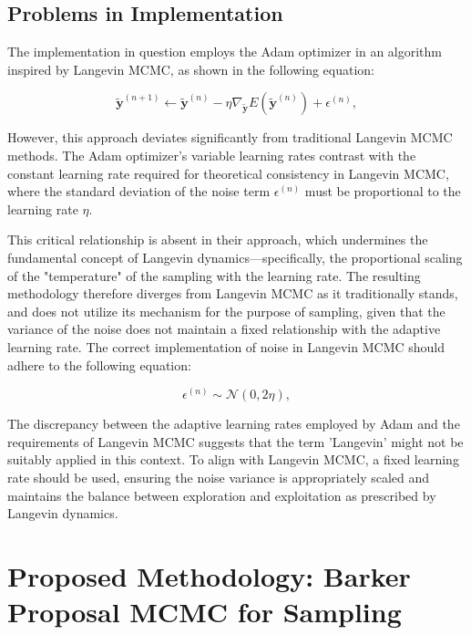 \documentclass{article}
\begin{document}
\subsection{Problems in Implementation}
The implementation in question employs the Adam optimizer in an algorithm inspired by Langevin MCMC, as shown in the following equation:

\begin{equation}
    \tilde{\boldsymbol{y}}^{(n+1)} \leftarrow \tilde{\boldsymbol{y}}^{(n)} - \eta \nabla_{\tilde{\boldsymbol{y}}} E(\tilde{\boldsymbol{y}}^{(n)}) + \epsilon^{(n)},
\end{equation}

However, this approach deviates significantly from traditional Langevin MCMC methods. The Adam optimizer's variable learning rates contrast with the constant learning rate required for theoretical consistency in Langevin MCMC, where the standard deviation of the noise term \( \epsilon^{(n)} \) must be proportional to the learning rate \( \eta \).

This critical relationship is absent in their approach, which undermines the fundamental concept of Langevin dynamics—specifically, the proportional scaling of the "temperature" of the sampling with the learning rate. The resulting methodology therefore diverges from Langevin MCMC as it traditionally stands, and does not utilize its mechanism for the purpose of sampling, given that the variance of the noise does not maintain a fixed relationship with the adaptive learning rate. The correct implementation of noise in Langevin MCMC should adhere to the following equation:

\begin{equation}
    \epsilon^{(n)} \sim \mathcal{N}(0, 2\eta),
\end{equation}

The discrepancy between the adaptive learning rates employed by Adam and the requirements of Langevin MCMC suggests that the term 'Langevin' might not be suitably applied in this context. To align with Langevin MCMC, a fixed learning rate should be used, ensuring the noise variance is appropriately scaled and maintains the balance between exploration and exploitation as prescribed by Langevin dynamics.

\section{Proposed Methodology: Barker Proposal MCMC for Sampling}
\end{document}
